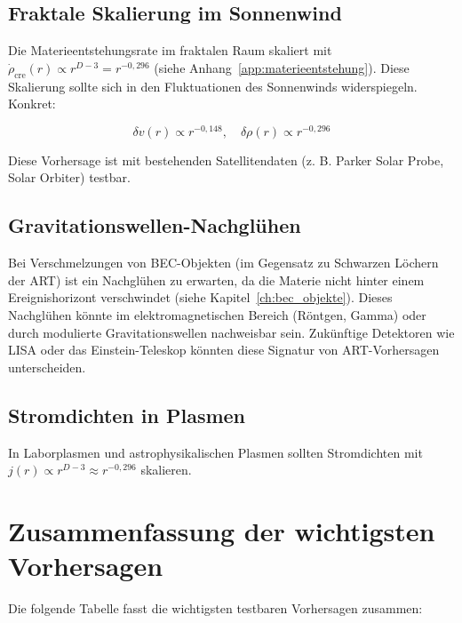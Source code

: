 \subsection{Fraktale Skalierung im Sonnenwind}
\label{sub:vorh_sonnenwind}

Die Materieentstehungsrate im fraktalen Raum skaliert mit \( \dot{\rho}_{\text{cre}}(r) \propto r^{D-3} = r^{-0,296} \) (siehe Anhang~\ref{app:materieentstehung}). Diese Skalierung sollte sich in den Fluktuationen des Sonnenwinds widerspiegeln. Konkret:

\[
\delta v(r) \propto r^{-0,148}, \quad \delta \rho(r) \propto r^{-0,296}
\]

Diese Vorhersage ist mit bestehenden Satellitendaten (z. B. Parker Solar Probe, Solar Orbiter) testbar.

\subsection{Gravitationswellen-Nachglühen}
\label{sub:vorh_nachgluehen}

Bei Verschmelzungen von BEC-Objekten (im Gegensatz zu Schwarzen Löchern der ART) ist ein Nachglühen zu erwarten, da die Materie nicht hinter einem Ereignishorizont verschwindet (siehe Kapitel~\ref{ch:bec_objekte}). Dieses Nachglühen könnte im elektromagnetischen Bereich (Röntgen, Gamma) oder durch modulierte Gravitationswellen nachweisbar sein. Zukünftige Detektoren wie LISA oder das Einstein-Teleskop könnten diese Signatur von ART-Vorhersagen unterscheiden.

\subsection{Stromdichten in Plasmen}
\label{sub:vorh_stromdichten}

In Laborplasmen und astrophysikalischen Plasmen sollten Stromdichten mit \( j(r) \propto r^{D-3} \approx r^{-0,296} \) skalieren.

\section{Zusammenfassung der wichtigsten Vorhersagen}
\label{sec:vorh_tabelle_zusammenfassung}

Die folgende Tabelle fasst die wichtigsten testbaren Vorhersagen zusammen:

